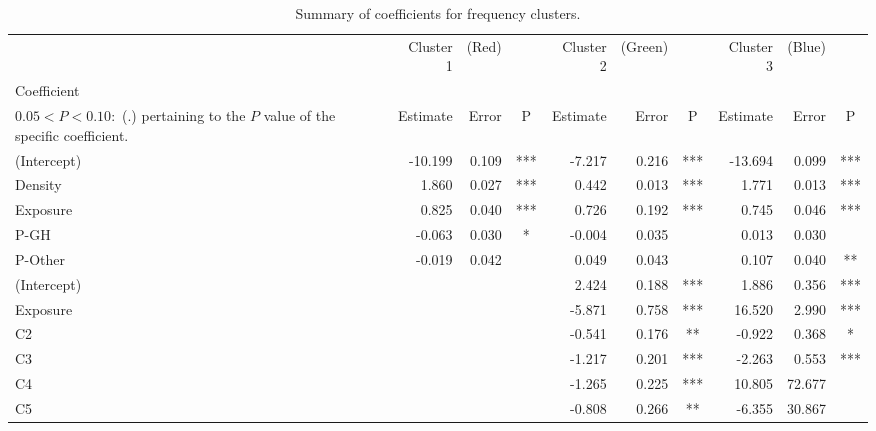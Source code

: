 \documentclass[11pt,letterpaper]{article}
\numberwithin{equation}{section}
\numberwithin{equation}{section}
\numberwithin{equation}{section}
\begin{document}
\begin{center}
\begin{table}
\caption{Summary of coefficients for frequency clusters.}
\label{frequencySummary}
\begin{tabular}{|l|rrc|rrc|rrc|}
\hline\hline
          & Cluster 1 & (Red) &   & Cluster 2 & (Green) &  & Cluster 3 & (Blue) &   \\
Coefficient \footnote{The significance codes are defined as $  P < 0.001 : $  (***), $0.001 < P < 0.01:$ (**), $  0.01 < P < 0.05:$ (*),\\ $0.05 < P < 0.10 : $ (.) %
pertaining to the $P$ value of the specific coefficient.}             & Estimate  & Error & P   & Estimate  & Error   & P   & Estimate  & Error  & P  \\
 \hline
(Intercept) & -10.199   & 0.109 & *** & -7.217    & 0.216   & *** & -13.694   & 0.099  & *** \\
Density     & 1.860     & 0.027 & *** & 0.442     & 0.013   & *** & 1.771     & 0.013  & *** \\
Exposure    & 0.825     & 0.040 & *** & 0.726     & 0.192   & *** & 0.745     & 0.046  & *** \\
P-GH        & -0.063    & 0.030 & *   & -0.004    & 0.035   &     & 0.013     & 0.030  &     \\
P-Other     & -0.019    & 0.042 &     & 0.049     & 0.043   &     & 0.107     & 0.040  & **  \\
\hline
(Intercept) &          &      &    & 2.424     & 0.188   & *** & 1.886     & 0.356  & *** \\
Exposure    &          &      &    & -5.871    & 0.758   & *** & 16.520    & 2.990  & *** \\
C2          &          &      &    & -0.541    & 0.176   & **  & -0.922    & 0.368  & *   \\
C3          &          &      &    & -1.217    & 0.201   & *** & -2.263    & 0.553  & *** \\
C4          &          &      &    & -1.265    & 0.225   & *** & 10.805    & 72.677 &     \\
C5          &          &      &    & -0.808    & 0.266   & **  & -6.355    & 30.867 &   \\
\hline\hline
\end{tabular}
\end{table}
\end{center}



\end{document}
